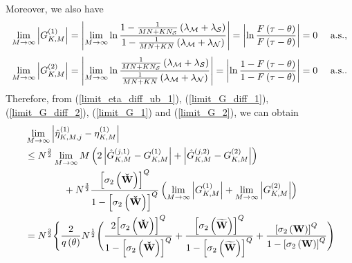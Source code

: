 \documentclass[11pt, draftclsnofoot, onecolumn]{IEEEtran}
\newcommand{\cW}{{\check{W}}}
\newcommand{\tW}{{\widetilde{W}}}
\begin{document}
\begin{IEEEproof}
  Moreover,    we also have
\begin{equation} \label{limit_G_1}
\mathop {\lim }\limits_{M \to \infty } \left| {G_{K,M}^{(1)}} \right| = \left| {\mathop {\lim }\limits_{M \to \infty } \ln \frac{{1 - \frac{1}{{MN + K{N_{\cal S}}}}\left( {{\lambda _{\cal M}} + {\lambda _{\cal S}}} \right)}}{{1 - \frac{1}{{MN + KN}}\left( {{\lambda _{\cal M}} + {\lambda _{\cal N}}} \right)}}} \right| = \left| {\ln \frac{{F\left( {\tau  - \theta } \right)}}{{F\left( {\tau  - \theta } \right)}}} \right| = 0 \quad \text{ a.s.},
\end{equation}
\begin{equation} \label{limit_G_2}
\mathop {\lim }\limits_{M \to \infty } \left| {G_{K,M}^{(2)}} \right| = \left| {\mathop {\lim }\limits_{M \to \infty } \ln \frac{{\frac{1}{{MN + K{N_{\cal S}}}}\left( {{\lambda _{\cal M}} + {\lambda _{\cal S}}} \right)}}{{\frac{1}{{MN + KN}}\left( {{\lambda _{\cal M}} + {\lambda _{\cal N}}} \right)}}} \right| = \left| {\ln \frac{{1 - F\left( {\tau  - \theta } \right)}}{{1 - F\left( {\tau  - \theta } \right)}}} \right| = 0 \quad \text{ a.s.}.
\end{equation}
Therefore, from (\ref{limit_eta_diff_ub_1}), (\ref{limit_G_diff_1}), (\ref{limit_G_diff_2}), (\ref{limit_G_1}) and (\ref{limit_G_2}), we can obtain
\begin{align} \notag
& \mathop {\lim }\limits_{M \to \infty } \left| {\hat \eta _{K,M,j}^{(1)} - \eta _{K,M}^{(1)}} \right| \\ \notag
& \le {N^{\frac{3}{2}}}\mathop {\lim }\limits_{M \to \infty } M\left( {2\left| {\hat G_{K,M}^{(j,1)} - G_{K,M}^{(1)}} \right|  + \left| {\hat G_{K,M}^{(j,2)} - G_{K,M}^{(2)}} \right|} \right) \\ \notag
& \qquad \qquad  + {N^{\frac{3}{2}}}\frac{{{{\left[ {{\sigma _2}\left( {\bf{\cW}} \right)} \right]}^Q}}}{{1 - {{\left[ {{\sigma _2}\left( {\bf{\cW}} \right)} \right]}^Q}}}\left( {\mathop {\lim }\limits_{M \to \infty } \left| {G_{K,M}^{(1)}} \right| + \mathop {\lim }\limits_{M \to \infty } \left| {G_{K,M}^{(2)}} \right|} \right)\\ \notag
& = {N^{\frac{3}{2}}}\Bigg\{ \frac{2}{{q\left( \theta  \right)}}{N^{\frac{1}{2}}}\Bigg( {\frac{{2{{\left[ {{\sigma _2}\left( {\bf{\cW}} \right)} \right]}^Q}}}{{1 - {{\left[ {{\sigma _2}\left( {\bf{\cW}} \right)} \right]}^Q}}} + \frac{{{{\left[ {{\sigma _2}\left( {\bf{\tW}} \right)} \right]}^Q}}}{{1 - {{\left[ {{\sigma _2}\left( {\bf{\tW}} \right)} \right]}^Q}}} + \frac{{{{\left[ {{\sigma _2}\left( {\bf{W}} \right)} \right]}^Q}}}{{1 - {{\left[ {{\sigma _2}\left( {\bf{W}} \right)} \right]}^Q}}}} \Bigg) \\  \notag

\end{align}
\end{IEEEproof}
\end{document}
